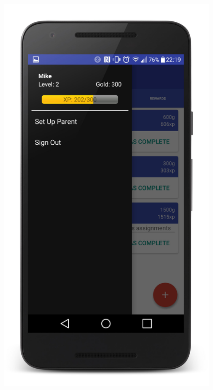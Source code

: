 \begin{figure}[ht]
\begin{minipage}[b]{0.25\linewidth}
    \centering
    \includegraphics[width=1\linewidth]{../images/Screenshot/NavigationBar.jpg}
    \vspace{2ex}
  \end{minipage} 
  \begin{minipage}[b]{0.25\linewidth}
    \centering

\end{minipage}
\end{figure}
